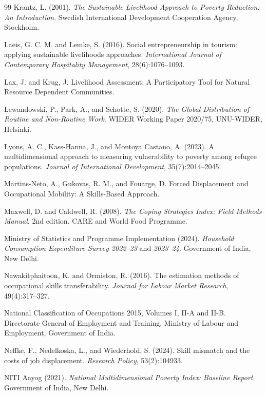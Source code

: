 \documentclass[11pt]{article}
\begin{document}
\begin{thebibliography}{99}
 Krantz, L. (2001). \textit{The Sustainable Livelihood Approach to Poverty Reduction: An Introduction}. Swedish International Development Cooperation Agency, Stockholm.

 Laeis, G. C. M. and Lemke, S. (2016). Social entrepreneurship in tourism: applying sustainable livelihoods approaches. \textit{International Journal of Contemporary Hospitality Management}, 28(6):1076--1093.

 Lax, J. and Krug, J. Livelihood Assessment: A Participatory Tool for Natural Resource Dependent Communities.

 Lewandowski, P., Park, A., and Schotte, S. (2020). \textit{The Global Distribution of Routine and Non-Routine Work}. WIDER Working Paper 2020/75, UNU-WIDER, Helsinki.

 Lyons, A. C., Kass-Hanna, J., and Montoya Castano, A. (2023). A multidimensional approach to measuring vulnerability to poverty among refugee populations. \textit{Journal of International Development}, 35(7):2014--2045.

 Martins-Neto, A., Gukovas, R. M., and Fouarge, D. Forced Displacement and Occupational Mobility: A Skills-Based Approach.

 Maxwell, D. and Caldwell, R. (2008). \textit{The Coping Strategies Index: Field Methods Manual}. 2nd edition. CARE and World Food Programme.

 Ministry of Statistics and Programme Implementation (2024). \textit{Household Consumption Expenditure Survey 2022--23} and \textit{2023--24}. Government of India, New Delhi.

 Nawakitphaitoon, K. and Ormiston, R. (2016). The estimation methods of occupational skills transferability. \textit{Journal for Labour Market Research}, 49(4):317--327.

 National Classification of Occupations 2015, Volumes I, II-A and II-B. Directorate General of Employment and Training, Ministry of Labour and Employment, Government of India.

 Neffke, F., Nedelkoska, L., and Wiederhold, S. (2024). Skill mismatch and the costs of job displacement. \textit{Research Policy}, 53(2):104933.

 NITI Aayog (2021). \textit{National Multidimensional Poverty Index: Baseline Report}. Government of India, New Delhi.


\end{thebibliography}
\end{document}
